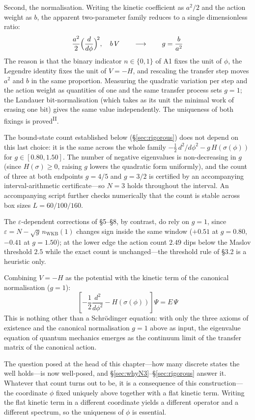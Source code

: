 \documentclass[12pt,a4paper]{article}
\newcommand{\PII}{\textsuperscript{\textup{II}}}
\begin{document}
Second, the normalisation. Writing the kinetic coefficient as $a^2/2$ and the action weight as $b$, the apparent two-parameter family reduces to a single dimensionless ratio:
\[\frac{a^2}{2}\Bigl(\frac{d}{d\phi}\Bigr)^{\!2},\quad b\,V \qquad\longrightarrow\qquad g = \frac{b}{a^2}\]
The reason is that the binary indicator $n \in \{0,1\}$ of A1 fixes the unit of $\phi$, the Legendre identity fixes the unit of $V = -H$, and rescaling the transfer step moves $a^2$ and $b$ in the same proportion. Measuring the quadratic variation per step and the action weight as quantities of one and the same transfer process sets $g = 1$; the Landauer bit-normalisation (which takes as its unit the minimal work of erasing one bit) gives the same value independently. The uniqueness of both fixings is proved\PII{}.

The bound-state count established below (\S\ref{sec:rigorous}) does not depend on this last choice: it is the same across the whole family $-\tfrac{1}{2}\,d^2\!/d\phi^2 - g\,H(\sigma(\phi))$ for $g \in [0.80, 1.50]$. The number of negative eigenvalues is non-decreasing in $g$ (since $H(\sigma) \ge 0$, raising $g$ lowers the quadratic form uniformly), and the count of three at both endpoints $g = 4/5$ and $g = 3/2$ is certified by an accompanying interval-arithmetic certificate---so $N = 3$ holds throughout the interval. An accompanying script further checks numerically that the count is stable across box sizes $L = 60/100/160$.

The $\varepsilon$-dependent corrections of \S5--\S8, by contrast, do rely on $g = 1$, since $\varepsilon = N - \sqrt{g}\,n_\mathrm{WKB}(1)$ changes sign inside the same window ($+0.51$ at $g = 0.80$, $-0.41$ at $g = 1.50$); at the lower edge the action count $2.49$ dips below the Maslov threshold $2.5$ while the exact count is unchanged---the threshold rule of \S3.2 is a heuristic only.

Combining $V = -H$ as the potential with the kinetic term of the canonical normalisation ($g = 1$):
\begin{equation}\label{eq:schrodinger}
  \left[-\frac{1}{2}\frac{d^2}{d\phi^2} - H(\sigma(\phi))\right]\Psi = E\,\Psi
\end{equation}
\noindent
This is nothing other than a Schr\"odinger equation: with only the three axioms of existence and the canonical normalisation $g = 1$ above as input, the eigenvalue equation of quantum mechanics emerges as the continuum limit of the transfer matrix of the canonical action.

The question posed at the head of this chapter---how many discrete states the well holds---is now well-posed, and \S\ref{sec:whyN3}--\S\ref{sec:rigorous} answer it. Whatever that count turns out to be, it is a consequence of this construction---the coordinate $\phi$ fixed uniquely above together with a flat kinetic term. Writing the flat kinetic term in a different coordinate yields a different operator and a different spectrum, so the uniqueness of $\phi$ is essential.
\end{document}
